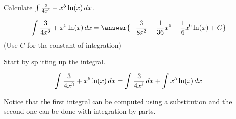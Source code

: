 \documentclass{ximera}
\author{Jim Talamo}
\begin{document}
\begin{exercise}
Calculate $\int \frac{3}{4x^3} + x^5 \ln(x) \mathop{}\!d x $.


\[
\int  \frac{3}{4x^3} + x^5 \ln(x) \d x = \answer{-\frac{3}{8x^2}-\frac{1}{36}x^6+\frac{1}{6}x^6\ln(x) + C } 
\]
(Use $C$ for the constant of integration)

\begin{hint}
Start by splitting up the integral.

\[
\int \frac{3}{4x^3} + x^5 \ln(x) \mathop{}\!d x  = \int \frac{3}{4x^3}  \mathop{}\!d x + \int x^5 \ln(x) \mathop{}\!d x 
\]

Notice that the first integral can be computed using a substitution and the second one can be done with integration by parts.

\end{hint}

\end{exercise}
\end{document}
